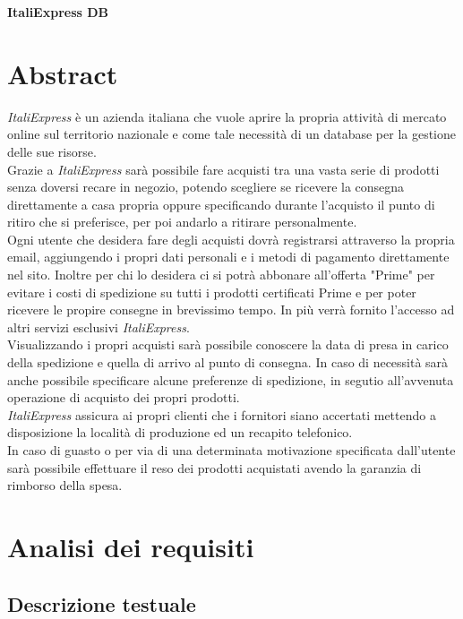 \documentclass[10pt]{article}
\begin{document}
\begin{center}
    \huge\textbf{ItaliExpress DB}
\end{center}

\section{Abstract}

\textit{ItaliExpress} è un azienda italiana che vuole aprire la propria attività di mercato online
sul territorio nazionale e come tale necessità di un database per la gestione delle sue risorse.\\
Grazie a \textit{ItaliExpress} sarà possibile fare acquisti tra una vasta serie di prodotti 
senza doversi recare in negozio, potendo scegliere se ricevere la consegna direttamente a casa
propria oppure specificando durante l'acquisto il punto di ritiro che si preferisce,
per poi andarlo a ritirare personalmente.\\
Ogni utente che desidera fare degli acquisti dovrà registrarsi attraverso la propria email,
aggiungendo i propri dati personali e i metodi di pagamento direttamente nel sito.
Inoltre per chi lo desidera ci si potrà abbonare all'offerta "Prime" per evitare i costi di spedizione
su tutti i prodotti certificati Prime e per poter ricevere le propire consegne in brevissimo tempo.
In più verrà fornito l'accesso ad altri servizi esclusivi \textit{ItaliExpress}.\\
Visualizzando i propri acquisti sarà possibile conoscere la data di presa in carico della spedizione
e quella di arrivo al punto di consegna. In caso di necessità sarà anche possibile specificare alcune preferenze
di spedizione, in segutio all'avvenuta operazione di acquisto dei propri prodotti.\\
\textit{ItaliExpress} assicura ai propri clienti che i fornitori siano accertati mettendo a disposizione
la località di produzione ed un recapito telefonico.\\
In caso di guasto o per via di una determinata motivazione specificata dall'utente sarà
possibile effettuare il reso dei prodotti acquistati avendo la garanzia di rimborso della spesa. 

\section{Analisi dei requisiti}

\subsection{Descrizione testuale}
\end{document}
